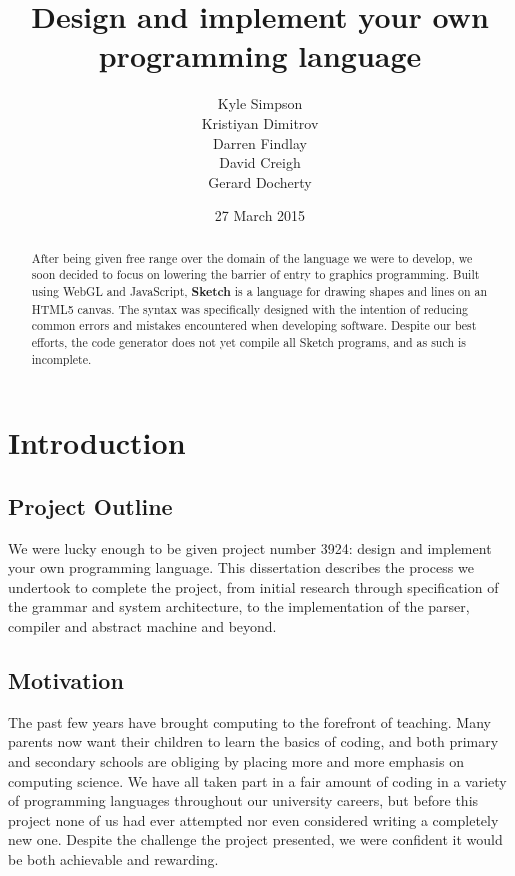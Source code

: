 \documentclass{l3proj}
\begin{document}
\nocite{*}
\title{Design and implement your own programming language}
\author{Kyle Simpson\\
		Kristiyan Dimitrov\\
		Darren Findlay\\
		David Creigh\\
		Gerard Docherty}
\date{27 March 2015}
\maketitle
\begin{abstract}
After being given free range over the domain of the language we were to develop, we soon decided to focus on lowering the barrier of entry to graphics programming. Built using WebGL and JavaScript, \textbf{Sketch} is a language for drawing shapes and lines on an HTML5 canvas. The syntax was specifically designed with the intention of reducing common errors and mistakes encountered when developing software. Despite our best efforts, the code generator does not yet compile all Sketch programs, and as such is incomplete.

\end{abstract}
\educationalconsent
\tableofcontents
\chapter{Introduction}
\label{intro}

\section{Project Outline}

We were lucky enough to be given project number 3924: design and implement your own programming language. This dissertation describes the process we undertook to complete the project, from initial research through specification of the grammar and system architecture, to the implementation of the parser, compiler and abstract machine and beyond.

\section{Motivation}

The past few years have brought computing to the forefront of teaching. Many parents now want their children to learn the basics of coding, and both primary and secondary schools are obliging by placing more and more emphasis on computing science. We have all taken part in a fair amount of coding in a variety of programming languages throughout our university careers, but before this project none of us had ever attempted nor even considered writing a completely new one. Despite the challenge the project presented, we were confident it would be both achievable and rewarding.
\end{document}
